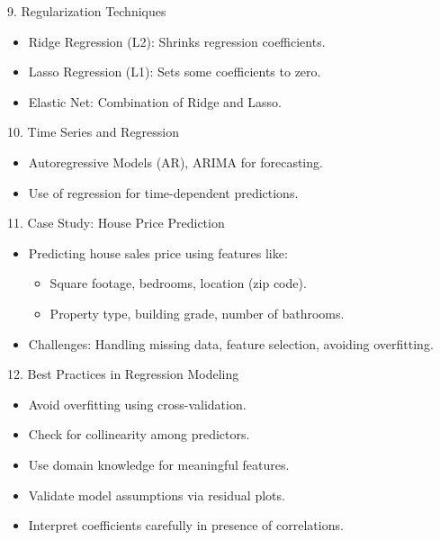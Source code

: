 \documentclass{beamer}
\begin{document}
\begin{frame}{9. Regularization Techniques}
    \begin{itemize}
        \item Ridge Regression (L2): Shrinks regression coefficients.
        \item Lasso Regression (L1): Sets some coefficients to zero.
        \item Elastic Net: Combination of Ridge and Lasso.
    \end{itemize}
\end{frame}

\begin{frame}{10. Time Series and Regression}
    \begin{itemize}
        \item Autoregressive Models (AR), ARIMA for forecasting.
        \item Use of regression for time-dependent predictions.
    \end{itemize}
\end{frame}

\begin{frame}{11. Case Study: House Price Prediction}
    \begin{itemize}
        \item Predicting house sales price using features like:
        \begin{itemize}
            \item Square footage, bedrooms, location (zip code).
            \item Property type, building grade, number of bathrooms.
        \end{itemize}
        \item Challenges: Handling missing data, feature selection, avoiding overfitting.
    \end{itemize}
\end{frame}

\begin{frame}{12. Best Practices in Regression Modeling}
    \begin{itemize}
        \item Avoid overfitting using cross-validation.
        \item Check for collinearity among predictors.
        \item Use domain knowledge for meaningful features.
        \item Validate model assumptions via residual plots.
        \item Interpret coefficients carefully in presence of correlations.
    \end{itemize}
\end{frame}
\end{document}
